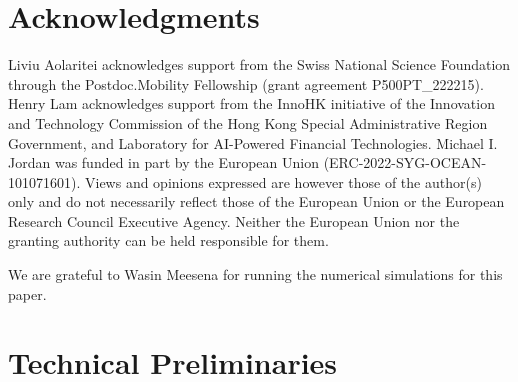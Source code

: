 \documentclass[11pt,a4paper]{article}
\theoremstyle{definition}
\begin{document}
\section*{Acknowledgments}

Liviu Aolaritei acknowledges support from the Swiss National Science Foundation through the Postdoc.Mobility Fellowship (grant agreement P500PT\_222215). Henry Lam acknowledges support from the InnoHK initiative of the Innovation and Technology Commission of the Hong Kong Special Administrative Region Government, and Laboratory for AI-Powered Financial Technologies. Michael I. Jordan was funded in part by the European Union (ERC-2022-SYG-OCEAN-101071601). Views and opinions expressed are however those of the author(s) only and do not necessarily reflect those of the European Union or the European Research Council Executive Agency. Neither the European Union nor the granting authority can be held responsible for them.

We are grateful to Wasin Meesena for running the numerical simulations for this paper.





















 










\appendix

\section{Technical Preliminaries}
\end{document}
